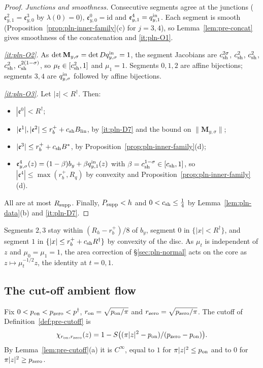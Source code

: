 \begin{proof}
\emph{Junctions and smoothness.} Consecutive segments agree at the junctions ($\mathfrak e^2_{y,1}=\mathfrak e^3_{y,0}$ by $\lambda(0)=0$), $\mathfrak e^0_{y,0}=\mathrm{id}$ and $\mathfrak e^4_{y,1}=q^{\rm in}_{y,1}$. Each segment is smooth (Proposition~\ref{prop:pln-inner-family}(c) for $j=3,4$), so Lemma~\ref{lem:pre-concat} gives smoothness of the concatenation and \ref{it:pln-O1}.

\emph{\ref{it:pln-O2}.} As $\det\mathbf M_{y,\sigma}=\det Dq^{\rm in}_{y,\sigma}=1$, the segment Jacobians are $c_{\rm sh}^{2\sigma}$, $c_{\rm sh}^2$, $c_{\rm sh}^2$, $c_{\rm sh}^2$, $c_{\rm sh}^{2(1-\sigma)}$, so $\mu_t\in[c_{\rm sh}^2,1]$ and $\mu_1=1$. Segments $0,1,2$ are affine bijections; segments $3,4$ are $q^{\rm in}_{y,\sigma}$ followed by affine bijections.

\emph{\ref{it:pln-O3}.} Let $|z|<R^\dagger$. Then:
\begin{itemize}
\item $|\mathfrak e^0|<R^\dagger$;
\item $|\mathfrak e^1|,|\mathfrak e^2|\le r_b^++c_{\rm sh}B_{\rm lin}$, by \ref{it:pln-D7} and the bound on $\|\mathbf M_{y,\sigma}\|$;
\item $|\mathfrak e^3|\le r_b^++c_{\rm sh}B^*$, by Proposition~\ref{prop:pln-inner-family}(d);
\item $\mathfrak e^4_{y,\sigma}(z)=(1-\beta)b_y+\beta q^{\rm in}_{y,1}(z)$ with $\beta=c_{\rm sh}^{1-\sigma}\in[c_{\rm sh},1]$, so $|\mathfrak e^4|\le\max(r_b^+,R_q)$ by convexity and Proposition~\ref{prop:pln-inner-family}(d).
\end{itemize}
All are at most $R_{\rm supp}$. Finally, $P_{\rm supp}<h$ and $0<c_{\rm sh}\le\frac14$ by Lemma~\ref{lem:pln-data}(b) and \ref{it:pln-D7}.
\end{proof}

Segments $2,3$ stay within $(R_h-r_b^+)/8$ of $b_y$, segment $0$ in $\{|x|<R^\dagger\}$, and segment $1$ in $\{|x|\le r_b^++c_{\rm sh}R^\dagger\}$ by convexity of the disc. As $\mu_t$ is independent of $z$ and $\mu_0=\mu_1=1$, the area correction of \S\ref{sec:pln-normal} acts on the core as $z\mapsto\mu_t^{-1/2}z$, the identity at $t=0,1$.

\subsection{The cut-off ambient flow}\label{sec:pln-flow}

Fix $0<p_{\rm on}<p_{\rm zero}<p^\dagger$, $r_{\rm on}=\sqrt{p_{\rm on}/\pi}$ and $r_{\rm zero}=\sqrt{p_{\rm zero}/\pi}$. The cutoff of Definition~\ref{def:pre-cutoff} is
\[
\chi_{r_{\rm on},r_{\rm zero}}(z)=1-S\bigl((\pi|z|^2-p_{\rm on})/(p_{\rm zero}-p_{\rm on})\bigr).
\]
By Lemma~\ref{lem:pre-cutoff}(a) it is $C^\infty$, equal to $1$ for $\pi|z|^2\le p_{\rm on}$ and to $0$ for $\pi|z|^2\ge p_{\rm zero}$.

